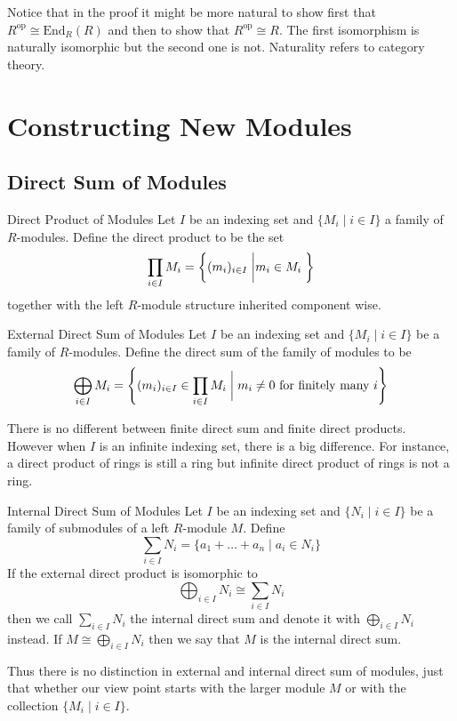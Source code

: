 \documentclass[a4paper]{article}
\begin{document}
Notice that in the proof it might be more natural to show first that $R^\text{op}\cong\text{End}_R(R)$ and then to show that $R^\text{op}\cong R$. The first isomorphism is naturally isomorphic but the second one is not. Naturality refers to category theory. 

\pagebreak
\section{Constructing New Modules}
\subsection{Direct Sum of Modules}
\begin{defn}{Direct Product of Modules}{} Let $I$ be an indexing set and $\{M_i\;|\;i\in I\}$ a family of $R$-modules. Define the direct product to be the set $$\prod_{i\in I}M_i=\left\{(m_i)_{i\in I}\;\bigg{|}m_i\in M_i\;\right\}$$ together with the left $R$-module structure inherited component wise. 
\end{defn}

\begin{defn}{External Direct Sum of Modules}{} Let $I$ be an indexing set and $\{M_i\;|\;i\in I\}$ be a family of $R$-modules. Define the direct sum of the family of modules to be $$\bigoplus_{i\in I}M_i=\left\{(m_i)_{i\in I}\in\prod_{i\in I}M_i\;\bigg{|}\;m_i\neq 0\text{ for finitely many }i\right\}$$
\end{defn}

There is no different between finite direct sum and finite direct products. However when $I$ is an infinite indexing set, there is a big difference. For instance, a direct product of rings is still a ring but infinite direct product of rings is not a ring. 

\begin{defn}{Internal Direct Sum of Modules}{} Let $I$ be an indexing set and $\{N_i\;|\;i\in I\}$ be a family of submodules of a left $R$-module $M$. Define $$\sum_{i\in I}N_i=\{a_1+\dots+a_n\;|\;a_i\in N_i\}$$ If the external direct product is isomorphic to $$\bigoplus_{i\in I}N_i\cong\sum_{i\in I}N_i$$ then we call $\sum_{i\in I}N_i$ the internal direct sum and denote it with $\bigoplus_{i\in I}N_i$ instead. If $M\cong\bigoplus_{i\in I}N_i$ then we say that $M$ is the internal direct sum. 
\end{defn}

Thus there is no distinction in external and internal direct sum of modules, just that whether our view point starts with the larger module $M$ or with the collection $\{M_i\;|\;i\in I\}$. 
\end{document}
